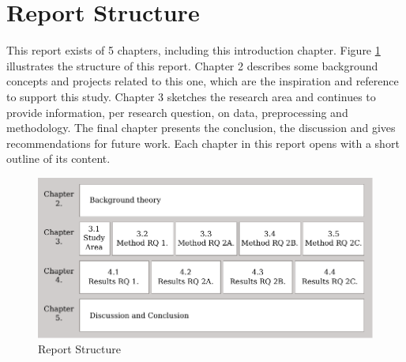 



	 


\section{Report Structure}
This report exists of 5 chapters, including this introduction chapter. Figure \ref{reportstruct} illustrates the structure of this report. Chapter 2 describes some background concepts and projects related to this one, which are the inspiration and reference to support this study. Chapter 3 sketches the research area and continues to provide information, per research question, on data, preprocessing and methodology. The final chapter presents the conclusion, the discussion and gives recommendations for future work. Each chapter in this report opens with a short outline of its content.

\begin{figure}[hbp]
\includegraphics[width=\textwidth]{img/I4_ReportStructure.pdf}
\centering
\caption{Report Structure}\label{reportstruct}
\end{figure}
